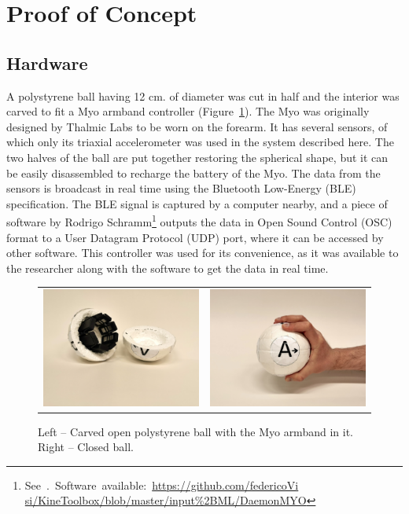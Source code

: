 \documentclass{nime-alternate_ADJ} %
\begin{document}
\section{Proof of Concept}

\subsection{Hardware}

A polystyrene ball having 12 cm. of diameter was cut in half and the interior was carved to fit a Myo armband controller (Figure~\ref{fig_2}). The Myo was originally designed by Thalmic Labs to be worn on the forearm. It has several sensors, of which only its triaxial accelerometer was used in the system described here. The two halves of the ball are put together restoring the spherical shape, but it can be easily disassembled to recharge the battery of the Myo. The data from the sensors is broadcast in real time using the Bluetooth Low-Energy (BLE) specification. The BLE signal is captured by a computer nearby, and a piece of software by Rodrigo Schramm\footnote{See~\cite{Visi_2017}.~Software~available:~\href{https://github.com/federicoVisi/KineToolbox/blob/master/input\%2BML/DaemonMYO}{https://github.com/federicoVi\\si/KineToolbox/blob/master/input\%2BML/DaemonMYO}} outputs the data in Open Sound Control (OSC) format to a User Datagram Protocol (UDP) port, where it can be accessed by other software. This controller was used for its convenience, as it was available to the researcher along with the software to get the data in real time.

\begin{figure}[t!]
   \setlength\tabcolsep{2pt} 
    \begin{tabular}{cc}
        \includegraphics[trim={10cm 24cm 10cm 6cm}, clip=true, width=0.48\columnwidth]{ball_open}
        &
        \includegraphics[trim={20cm 15cm 0cm 15cm}, clip=true, width=0.48\columnwidth]{ball_handheld}
    \end{tabular}
	\caption{Left -- Carved open polystyrene ball with the Myo armband in it. Right -- Closed ball.}
	\label{fig_2}
\end{figure}
\end{document}
